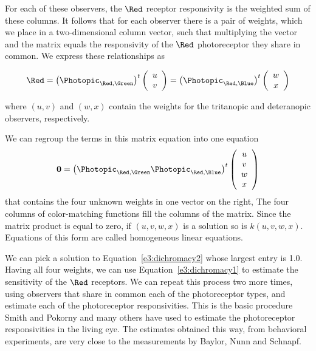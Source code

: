 
%
%


For each of these observers,
the $\Red$ receptor responsivity is the weighted sum
of these columns.
It follows that for each observer there is
a pair of weights, which we place in a two-dimensional
column vector, such that multiplying the vector and
the matrix equals
the responsivity of the $\Red$ photoreceptor
they share in common.
We express these relationships as

\begin{equation}
\label{e3:dichromacy1}
\Red =
\left (  \Photopic_{\Red,\Green } \right )^{t} 
\left ( \begin{array}{c} u \\ v  \end{array} \right )
  = 
\left (  \Photopic_{\Red,\Blue} \right )^{t}
\left (  \begin{array}{c}  w \\ x \end{array}\right )
\end{equation}

where $(u,v)$ and $(w,x)$ contain the weights for 
the tritanopic and deteranopic observers, respectively.

We can regroup the terms in this matrix equation
into one equation
\begin{equation}
\label{e3:dichromacy2}
{\bf 0} =
\left (  \Photopic_{\Red,\Green} \Photopic_{\Red,\Blue} \right )^{t}
\left ( \begin{array}{c} u \\ v \\ w \\ x  \end{array} \right )
\end{equation}
that contains the four unknown weights
in one vector on the right,
The four columns of color-matching functions
fill the columns of the matrix.
Since the matrix product is equal to zero, if $(u,v,w,x)$ is
a solution so is $k (u,v,w,x)$.
Equations of this form are called homogeneous linear equations.

We can pick a solution to Equation~\ref{e3:dichromacy2}
whose largest entry is 1.0.
Having all four weights, we can use
Equation~\ref{e3:dichromacy1}
to estimate the sensitivity of the $\Red$ receptors.
We can repeat this process two more times,
using observers that share in common each of the photoreceptor types,
and estimate each of the photoreceptor responsivities.
This is the basic procedure Smith and Pokorny and many others
have used to estimate the photoreceptor responsivities
in the living eye.
The estimates obtained this way,
from behavioral experiments,
are very close to the measurements by Baylor, Nunn and Schnapf.
